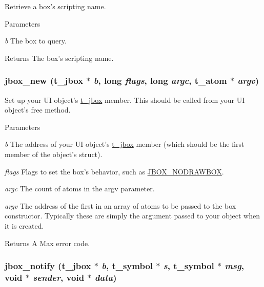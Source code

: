Retrieve a box's scripting name. 
\begin{DoxyParams}{Parameters}
\item[{\em b}]The box to query. \end{DoxyParams}
\begin{DoxyReturn}{Returns}
The box's scripting name. 
\end{DoxyReturn}
\hypertarget{group__jbox_gaaa460d02ca3d22c54368ade59d8e330b}{
\subsubsection[{jbox\_\-new}]{ jbox\_\-new ({\bf t\_\-jbox} $\ast$ {\em b}, \/  long {\em flags}, \/  long {\em argc}, \/  {\bf t\_\-atom} $\ast$ {\em argv})}}
\label{group__jbox_gaaa460d02ca3d22c54368ade59d8e330b}


Set up your UI object's \hyperlink{structt__jbox}{t\_\-jbox} member. This should be called from your UI object's free method.


\begin{DoxyParams}{Parameters}
\item[{\em b}]The address of your UI object's \hyperlink{structt__jbox}{t\_\-jbox} member (which should be the first member of the object's struct). \item[{\em flags}]Flags to set the box's behavior, such as \hyperlink{group__jbox_ga5b6543cfc10a8912a82cebada525a770}{JBOX\_\-NODRAWBOX}. \item[{\em argc}]The count of atoms in the argv parameter. \item[{\em argv}]The address of the first in an array of atoms to be passed to the box constructor. Typically these are simply the argument passed to your object when it is created. \end{DoxyParams}
\begin{DoxyReturn}{Returns}
A Max error code. 
\end{DoxyReturn}
\hypertarget{group__jbox_ga9aa791abf47ea1cb276c5a867665a52a}{
\subsubsection[{jbox\_\-notify}]{ jbox\_\-notify ({\bf t\_\-jbox} $\ast$ {\em b}, \/  {\bf t\_\-symbol} $\ast$ {\em s}, \/  {\bf t\_\-symbol} $\ast$ {\em msg}, \/  void $\ast$ {\em sender}, \/  void $\ast$ {\em data})}}
\label{group__jbox_ga9aa791abf47ea1cb276c5a867665a52a}


